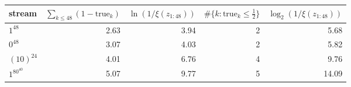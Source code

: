 \begin{tabular}{lrrrr}
\toprule
stream & $\sum_{k\le48}(1-\mathrm{true}_k)$ & $\ln(1/\xi(z_{1:48}))$ & $\#\{k:\mathrm{true}_k\le\frac12\}$ & $\log_2(1/\xi(z_{1:48}))$ \\
\midrule
$1^{48}$ & 2.63 & 3.94 & 2 & 5.68 \\
$0^{48}$ & 3.07 & 4.03 & 2 & 5.82 \\
$(10)^{24}$ & 4.01 & 6.76 & 4 & 9.76 \\
$1^80^{40}$ & 5.07 & 9.77 & 5 & 14.09 \\
\bottomrule
\end{tabular}
